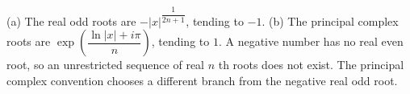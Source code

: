 (a) The real odd roots are $-|x|^{\dfrac{1}{2n+1}}$, tending to $\boxed{-1}$. (b) The principal complex roots are $\exp\left(\dfrac{\ln|x|+i\pi}{n}\right)$, tending to $\boxed1$. A negative number has no real even root, so an unrestricted sequence of real $n$ th roots does not exist. The principal complex convention chooses a different branch from the negative real odd root.
